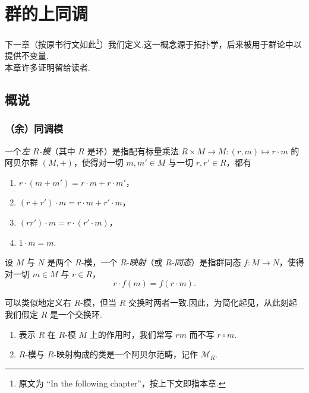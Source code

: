 
\chapter{群的上同调}
\label{ch:4}

下一章（按原书行文如此\footnote{原文为 ``In the following chapter''，按上下文即指本章.}）我们定义.这一概念源于拓扑学，后来被用于群论中以提供不变量.\\
本章许多证明留给读者.

\section{概说}

\subsection{（余）同调模}

\begin{definition}\label{c4-def-1-1}
一个\emph{左 $R$-模}（其中 $R$ 是环）是指配有标量乘法 $R\times M\to M:(r,m)\mapsto r\cdot m$ 的阿贝尔群 $(M,+)$，使得对一切 $m,m'\in M$ 与一切 $r,r'\in R$，都有
\begin{enumerate}[label=(\arabic*),leftmargin=*]
    \item $r\cdot(m+m')=r\cdot m+r\cdot m'$，
    \item $(r+r')\cdot m=r\cdot m+r'\cdot m$，
    \item $(rr')\cdot m=r\cdot(r'\cdot m)$，
    \item $1\cdot m=m$.
\end{enumerate}
\end{definition}

\begin{definition}\label{c4-def-1-2}
设 $M$ 与 $N$ 是两个 $R$-模，一个 $R$-\emph{映射}（或 $R$-\emph{同态}）是指群同态 $f:M\to N$，使得对一切 $m\in M$ 与 $r\in R$，
\[
r\cdot f(m)=f(r\cdot m).
\]
\end{definition}

可以类似地定义右 $R$-模，但当 $R$ 交换时两者一致.因此，为简化起见，从此刻起我们假定 $R$ 是一个交换环.

\begin{notation}\label{c4-not-1-3}
\begin{enumerate}[label=(\arabic*),leftmargin=*]
    \item 表示 $R$ 在 $R$-模 $M$ 上的作用时，我们常写 $rm$ 而不写 $r\circ m$.
    \item $R$-模与 $R$-映射构成的类是一个阿贝尔范畴，记作 $\mathscr{M}_R$.
\end{enumerate}
\end{notation}

